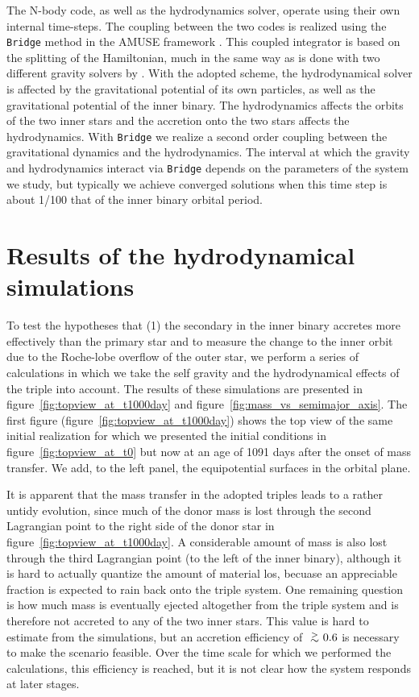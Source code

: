 \documentclass[twocolumn]{aastex62}
\def\apgt{\ {\raise-.5ex\hbox{$\buildrel>\over\sim$}}\ }
\begin{document}
The N-body code, as well as the hydrodynamics solver, operate using
their own internal time-steps. The coupling between the two codes is
realized using the \texttt{Bridge} method in the AMUSE framework
\citep[see Sect.\.4.3.1 in][]{2013CoPhC.183..456P}.  This coupled
integrator is based on the splitting of the Hamiltonian, much in the
same way as is done with two different gravity solvers by
\cite{2007PASJ...59.1095F}. With the adopted scheme, the
hydrodynamical solver is affected by the gravitational potential of
its own particles, as well as the gravitational potential of the inner
binary. The hydrodynamics affects the orbits of the two inner stars
and the accretion onto the two stars affects the hydrodynamics. With
\texttt{Bridge} we realize a second order coupling between the
gravitational dynamics and the hydrodynamics.  The interval at which
the gravity and hydrodynamics interact via \texttt{Bridge} depends on
the parameters of the system we study, but typically we achieve
converged solutions when this time step is about 1/100 that of the
inner binary orbital period.

\section{Results of the hydrodynamical simulations} \label{results}

To test the hypotheses that (1) the secondary in the inner binary
accretes more effectively than the primary star and to measure the
change to the inner orbit due to the Roche-lobe overflow of the outer
star, we perform a series of calculations in which we take the self
gravity and the hydrodynamical effects of the triple into account.
The results of these simulations are presented in
figure~\ref{fig:topview_at_t1000day} and
figure~\ref{fig:mass_vs_semimajor_axis}.  The first figure
(figure~\ref{fig:topview_at_t1000day}) shows the top view of the same
initial realization for which we presented the initial conditions in
figure~\ref{fig:topview_at_t0} but now at an age of 1091 days after
the onset of mass transfer. We add, to the left panel,
the equipotential surfaces in the orbital plane.

It is apparent that the mass transfer in the adopted triples leads to
a rather untidy evolution, since much of the donor mass is lost
through the second Lagrangian point to the right side of the donor
star in figure~\ref{fig:topview_at_t1000day}. A considerable amount of
mass is also lost through the third Lagrangian point (to the left of
the inner binary), although it is hard to actually quantize the amount
of material los, becuase an appreciable fraction is expected to rain
back onto the triple system.  One remaining question is how much mass
is eventually ejected altogether from the triple system and is
therefore not accreted to any of the two inner stars. This value is
hard to estimate from the simulations, but an accretion efficiency of
$\apgt 0.6$ is necessary to make the scenario feasible. Over the time
scale for which we performed the calculations, this efficiency is
reached, but it is not clear how the system responds at later stages.
\end{document}
